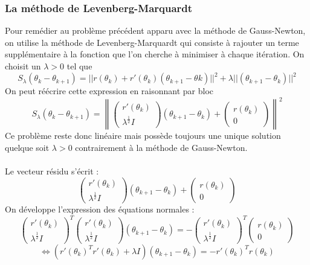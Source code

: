       \subsubsection{La méthode de Levenberg-Marquardt}
      \label{subsubsec:LM}
      Pour remédier au problème précédent apparu avec la méthode de Gauss-Newton, on utilise la méthode de Levenberg-Marquardt qui consiste à rajouter un terme supplémentaire à la fonction que l'on cherche à minimiser à chaque itération. On choisit un $\lambda > 0$ tel que 
      $$S_\lambda(\theta_k-\theta_{k+1}) = ||r(\theta_k)+r'(\theta_k)(\theta_{k+1}-\theta{k})||^2+\lambda||(\theta_{k+1}-\theta_k)||^2$$
      On peut réécrire cette expression en raisonnant par bloc
      $$S_\lambda(\theta_k-\theta_{k+1}) = \left\lVert \begin{pmatrix}
          r'(\theta_k)\\
          \lambda^{\frac{1}{2}}I
      \end{pmatrix}(\theta_{k+1}-\theta_k)+\begin{pmatrix}
          r(\theta_k)\\0
      \end{pmatrix}\right\rVert^2$$
      Ce problème reste donc linéaire mais possède toujours une unique solution quelque soit $\lambda>0$ contrairement à la méthode de Gauss-Newton.
      \\\\
      Le vecteur résidu s'écrit : 
      $$\begin{pmatrix}
          r'(\theta_k)\\
          \lambda^{\frac{1}{2}}I
      \end{pmatrix}(\theta_{k+1}-\theta_k)+\begin{pmatrix}
          r(\theta_k)\\0
      \end{pmatrix}$$
      On développe l'expression des équations normales : 
      $$
      \begin{pmatrix}
         r'(\theta_k)\\
         \lambda^{\frac{1}{2}}I
      \end{pmatrix}^T
      \begin{pmatrix}
          r'(\theta_k)\\
          \lambda^{\frac{1}{2}}I
      \end{pmatrix}(\theta_{k+1}-\theta_k)=-\begin{pmatrix}
         r'(\theta_k)\\
         \lambda^{\frac{1}{2}}I
      \end{pmatrix}^T
      \begin{pmatrix}
          r(\theta_k)\\0
      \end{pmatrix}
      $$$$\Leftrightarrow
      (r'(\theta_k)^Tr'(\theta_k)+\lambda I)(\theta_{k+1}-\theta_k)=-r'(\theta_k)^Tr(\theta_k)
      $$
